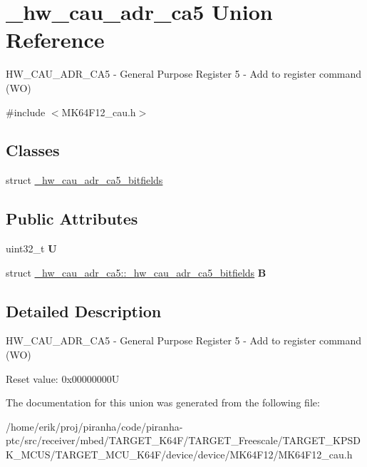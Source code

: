 \hypertarget{union__hw__cau__adr__ca5}{}\section{\+\_\+hw\+\_\+cau\+\_\+adr\+\_\+ca5 Union Reference}
\label{union__hw__cau__adr__ca5}


H\+W\+\_\+\+C\+A\+U\+\_\+\+A\+D\+R\+\_\+\+C\+A5 -\/ General Purpose Register 5 -\/ Add to register command (WO)  




{\ttfamily \#include $<$M\+K64\+F12\+\_\+cau.\+h$>$}

\subsection*{Classes}
\begin{DoxyCompactItemize}
\item 
struct \hyperlink{struct__hw__cau__adr__ca5_1_1__hw__cau__adr__ca5__bitfields}{\+\_\+hw\+\_\+cau\+\_\+adr\+\_\+ca5\+\_\+bitfields}
\end{DoxyCompactItemize}
\subsection*{Public Attributes}
\begin{DoxyCompactItemize}
\item 
uint32\+\_\+t {\bfseries U}\hypertarget{union__hw__cau__adr__ca5_a758e0b702b98b6d9b7fa549e6b62cbdc}{}\label{union__hw__cau__adr__ca5_a758e0b702b98b6d9b7fa549e6b62cbdc}

\item 
struct \hyperlink{struct__hw__cau__adr__ca5_1_1__hw__cau__adr__ca5__bitfields}{\+\_\+hw\+\_\+cau\+\_\+adr\+\_\+ca5\+::\+\_\+hw\+\_\+cau\+\_\+adr\+\_\+ca5\+\_\+bitfields} {\bfseries B}\hypertarget{union__hw__cau__adr__ca5_a0a5aa7bf4b972b4aa8429901d31f9371}{}\label{union__hw__cau__adr__ca5_a0a5aa7bf4b972b4aa8429901d31f9371}

\end{DoxyCompactItemize}


\subsection{Detailed Description}
H\+W\+\_\+\+C\+A\+U\+\_\+\+A\+D\+R\+\_\+\+C\+A5 -\/ General Purpose Register 5 -\/ Add to register command (WO) 

Reset value\+: 0x00000000U 

The documentation for this union was generated from the following file\+:\begin{DoxyCompactItemize}
\item 
/home/erik/proj/piranha/code/piranha-\/ptc/src/receiver/mbed/\+T\+A\+R\+G\+E\+T\+\_\+\+K64\+F/\+T\+A\+R\+G\+E\+T\+\_\+\+Freescale/\+T\+A\+R\+G\+E\+T\+\_\+\+K\+P\+S\+D\+K\+\_\+\+M\+C\+U\+S/\+T\+A\+R\+G\+E\+T\+\_\+\+M\+C\+U\+\_\+\+K64\+F/device/device/\+M\+K64\+F12/M\+K64\+F12\+\_\+cau.\+h\end{DoxyCompactItemize}

